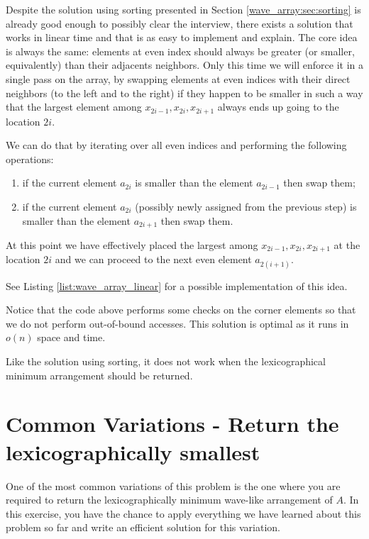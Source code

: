 Despite the solution using sorting presented in Section \ref{wave_array:sec:sorting} is already good enough to
possibly clear the interview, there exists a solution that works in linear time and that is as easy to
implement and explain. The core idea is always the same: elements at even index should always be
greater (or smaller, equivalently) than their adjacents neighbors. Only this time we will enforce it in a single pass on the array, by
swapping elements at even indices with their direct neighbors (to the left and to the right) if they happen to be smaller in such a way that the largest element among  $x_{2i-1},x_{2i},x_{2i+1}$ always ends up going to the location $2i$.

We can do that by iterating over all even indices and performing the following operations:
\begin{enumerate}
	\item if the current element $a_{2i}$ is smaller than the element $a_{2i-1}$ then swap them; 
	\item if the current element $a_{2i}$ (possibly newly assigned from the previous step) is smaller than the element $a_{2i+1}$ then swap them.
\end{enumerate}
At this point we have effectively placed the largest among $x_{2i-1},x_{2i},x_{2i+1}$ at the location $2i$ and we can proceed to the next even element $a_{2(i+1)}$. 

See Listing \ref{list:wave_array_linear} for a possible implementation of this idea.



Notice that the code above performs some checks on the corner elements so that we do not perform out-of-bound accesses.
This solution is optimal as it runs in $o(n)$ space and time. 

Like the solution using sorting, it does not work when the lexicographical minimum arrangement should be returned.

\section{Common Variations - Return the lexicographically smallest}
\label{sec:wave-array:smallest}

One of the most common variations of this problem is the one where you are required to return the lexicographically minimum wave-like arrangement of $A$. In this exercise, you have the chance to apply everything we have learned about this problem so far and write an efficient solution for this variation.

